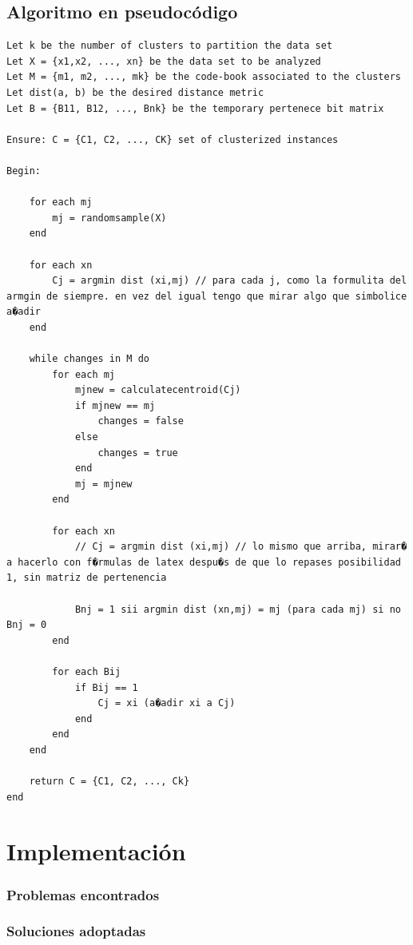 \documentclass[10pt,a4paper]{article}
\begin{document}

\subsection{Algoritmo en pseudocódigo}

\begin{lstlisting}
Let k be the number of clusters to partition the data set
Let X = {x1,x2, ..., xn} be the data set to be analyzed
Let M = {m1, m2, ..., mk} be the code-book associated to the clusters
Let dist(a, b) be the desired distance metric
Let B = {B11, B12, ..., Bnk} be the temporary pertenece bit matrix

Ensure: C = {C1, C2, ..., CK} set of clusterized instances

Begin:

	for each mj
		mj = randomsample(X)
	end
		
	for each xn
		Cj = argmin dist (xi,mj) // para cada j, como la formulita del armgin de siempre. en vez del igual tengo que mirar algo que simbolice a�adir
	end
		
	while changes in M do
		for each mj
			mjnew = calculatecentroid(Cj)
			if mjnew == mj
				changes = false
			else
				changes = true
			end
			mj = mjnew	
		end
		
		for each xn
			// Cj = argmin dist (xi,mj) // lo mismo que arriba, mirar� a hacerlo con f�rmulas de latex despu�s de que lo repases posibilidad 1, sin matriz de pertenencia
			
			Bnj = 1 sii argmin dist (xn,mj) = mj (para cada mj) si no Bnj = 0 
		end
		
		for each Bij 
			if Bij == 1
				Cj = xi (a�adir xi a Cj)
			end
		end
	end
	
	return C = {C1, C2, ..., Ck}
end
\end{lstlisting}
\section{Implementación}

\subsubsection{Problemas encontrados} 

\subsubsection{Soluciones adoptadas} 
\end{document}
